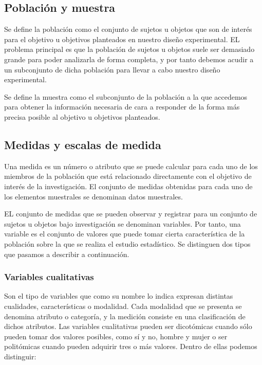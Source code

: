 \documentclass[
]{book}
\begin{document}
\hypertarget{poblaciuxf3n-y-muestra}{%
\subsection{Población y muestra}\label{poblaciuxf3n-y-muestra}}

Se define la población como el conjunto de sujetos u objetos que son de interés para el objetivo u objetivos planteados en nuestro diseño experimental. EL problema principal es que la población de sujetos u objetos suele ser demasiado grande para poder analizarla de forma completa, y por tanto debemos acudir a un subconjunto de dicha población para llevar a cabo nuestro diseño experimental.

Se define la muestra como el subconjunto de la población a la que accedemos para obtener la información necesaria de cara a responder de la forma más precisa posible al objetivo u objetivos planteados.

\hypertarget{medidas-y-escalas-de-medida}{%
\subsection{Medidas y escalas de medida}\label{medidas-y-escalas-de-medida}}

Una medida es un número o atributo que se puede calcular para cada uno de los miembros de la población que está relacionado directamente con el objetivo de interés de la investigación. El conjunto de medidas obtenidas para cada uno de los elementos muestrales se denominan datos muestrales.

EL conjunto de medidas que se pueden observar y registrar para un conjunto de sujetos u objetos bajo investigación se denominan variables. Por tanto, una variable es el conjunto de valores que puede tomar cierta característica de la población sobre la que se realiza el estudio estadístico. Se distinguen dos tipos que pasamos a describir a continuación.

\hypertarget{variables-cualitativas}{%
\subsubsection{Variables cualitativas}\label{variables-cualitativas}}

Son el tipo de variables que como su nombre lo indica expresan distintas cualidades, características o modalidad. Cada modalidad que se presenta se denomina atributo o categoría, y la medición consiste en una clasificación de dichos atributos. Las variables cualitativas pueden ser dicotómicas cuando sólo pueden tomar dos valores posibles, como sí y no, hombre y mujer o ser politómicas cuando pueden adquirir tres o más valores. Dentro de ellas podemos distinguir:
\end{document}
